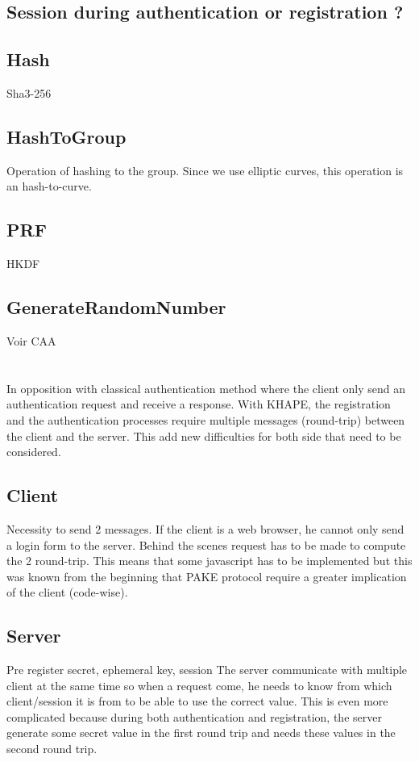 \documentclass[../report.tex]{subfiles}
\begin{document}
\subsection{Session during authentication or registration ?}


\subsection{Hash}
Sha3-256

\subsection{HashToGroup}
Operation of hashing to the group. Since we use elliptic curves, this operation is an hash-to-curve.


\subsection{PRF}
HKDF



\subsection{GenerateRandomNumber}
Voir CAA





\section{}

In opposition with classical authentication method where the client only send an authentication request and receive a response. With KHAPE, the registration and the authentication processes require multiple messages (round-trip) between the client and the server.
This add new difficulties for both side that need to be considered.

\subsection{Client}
Necessity to send 2 messages. If the client is a web browser, he cannot only send a login form to the server. Behind the scenes request has to be made to compute the 2 round-trip. This means that some javascript has to be implemented but this was known from the beginning that PAKE protocol require a greater implication of the client (code-wise).

\subsection{Server}
Pre register secret, ephemeral key, session
The server communicate with multiple client at the same time so when a request come, he needs to know from which client/session it is from to be able to use the correct value. This is even more complicated because during both authentication and registration, the server generate some secret value in the first round trip and needs these values in the second round trip.
\end{document}
